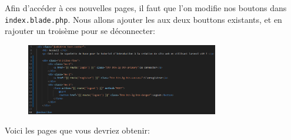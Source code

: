 Afin d'accéder à ces nouvelles pages, il faut que l'on modifie nos boutons dans \verb|index.blade.php|. Nous allons ajouter les \routes{} aux deux bouttons existants, et en rajouter un troisème pour se déconnecter:

\begin{figure}[!h]
    \centering
    \includegraphics[width=0.75\textwidth]{figures-C1/index_auth.pdf}
\end{figure}

Voici les pages que vous devriez obtenir:

